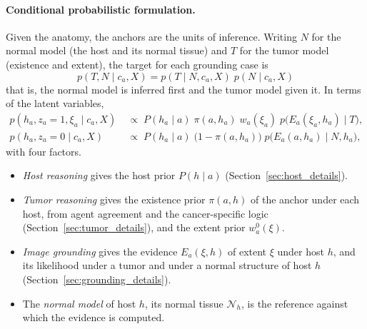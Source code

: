 \documentclass[fleqn,10pt]{olplainarticle}
\begin{document}
\paragraph{Conditional probabilistic formulation.}
Given the anatomy, the anchors are the units of inference. Writing $N$ for the normal model (the host and its normal
tissue) and $T$ for the tumor model (existence and extent), the target for each grounding case is
\begin{equation}
\label{eq:conditional_joint}
\boxed{
p(T,N\mid c_a,X)=p(T\mid N,c_a,X)\;p(N\mid c_a,X)
}
\end{equation}
that is, the normal model is inferred first and the tumor model given it. In terms of the latent variables,
\begin{equation}
\label{eq:case_posterior}
\begin{aligned}
p(h_a,z_a=1,\xi_a\mid c_a,X)&\;\propto\;P(h_a\mid a)\;\pi(a,h_a)\;w_a(\xi_a)\;p\bigl(E_a(\xi_a,h_a)\mid T\bigr),\\
p(h_a,z_a=0\mid c_a,X)&\;\propto\;P(h_a\mid a)\;\bigl(1-\pi(a,h_a)\bigr)\;p\bigl(E_a(a,h_a)\mid N,h_a\bigr),
\end{aligned}
\end{equation}
with four factors.
\begin{itemize}
\item \emph{Host reasoning} gives the host prior $P(h\mid a)$ (Section~\ref{sec:host_details}).
\item \emph{Tumor reasoning} gives the existence prior $\pi(a,h)$ of the anchor under each host, from agent agreement and the
cancer-specific logic (Section~\ref{sec:tumor_details}), and the extent prior $w^{0}_a(\xi)$.
\item \emph{Image grounding} gives the evidence $E_a(\xi,h)$ of extent $\xi$ under host $h$, and its likelihood under a tumor
and under a normal structure of host $h$ (Section~\ref{sec:grounding_details}).
\item The \emph{normal model} of host $h$, its normal tissue $\mathcal{N}_h$, is the reference against which the evidence
is computed.
\end{itemize}
\end{document}
